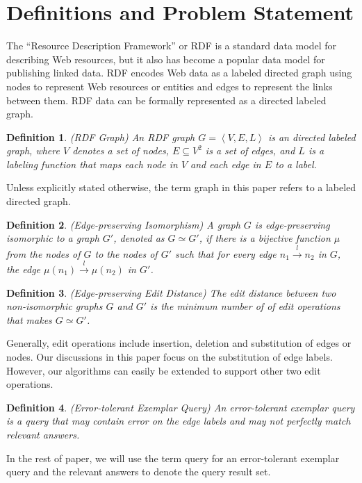 \documentclass{sigmod}
\newtheorem{definition}{Definition}
\begin{document}
\section{Definitions and Problem Statement}
The ``Resource Description Framework'' or RDF\cite{klyne2006resource} is a standard data model for describing Web resources, but it also has become a popular data model for publishing linked data.  RDF encodes Web data as a labeled directed graph using nodes to represent Web resources or entities and edges to represent the links between them.  RDF data can be formally represented as a directed labeled graph. 
\begin{definition}{(RDF Graph)}
An RDF graph $G = \left \langle V, E, L\right\rangle$ is an directed labeled graph, where $V$ denotes a set of nodes, $E \subseteq V^2$ is a set of edges, and $L$ is a labeling function that maps each node in $V$ and each edge in $E$ to a label.
\end{definition}

Unless explicitly stated otherwise, the term graph in this paper refers to a labeled directed graph.

\begin{definition}{(Edge-preserving Isomorphism)}
A graph $G$ is edge-preserving isomorphic to a graph $G'$, denoted as $G\simeq G'$, if there is a bijective function $\mu$ from the nodes of $G$ to the nodes of $G'$ such that for every edge $n_1 \xrightarrow{l} n_{2}$ in $G$, the edge $\mu(n_1) \xrightarrow{l} \mu(n_2)$ in $G'$.
\end{definition}

\begin{definition}{(Edge-preserving Edit Distance)}
The edit distance between two non-isomorphic graphs $G$ and $G'$ is the minimum number of of edit operations that makes $G \simeq G'$. 
\end{definition}

Generally, edit operations include insertion, deletion and substitution of edges or nodes. Our discussions in this paper focus on the substitution of edge labels.  However, our algorithms can easily be extended to support other two edit operations. 

\begin{definition}{(Error-tolerant Exemplar Query)}
An error-tolerant exemplar query is a query that may contain error on the edge labels and may not perfectly match relevant answers. 
\end{definition}

In the rest of paper, we will use the term query for an error-tolerant exemplar query and the relevant answers to denote the query result set. 
\end{document}
